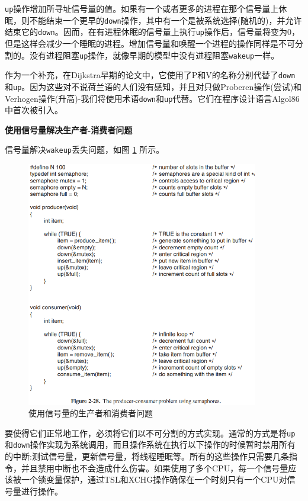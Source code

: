 	\texttt{up}操作增加所寻址信号量的值。如果有一个或者更多的进程在那个信号量上休眠，则不能结束一个更早的\texttt{down}操作，其中有一个是被系统选择(随机的)，并允许结束它的\texttt{down}。因而，在有进程休眠的信号量上执行\texttt{up}操作后，信号量将变为0，但是这样会减少一个睡眠的进程。增加信号量和唤醒一个进程的操作同样是不可分割的。没有进程阻塞\texttt{up}操作，就像早期的模型中没有进程阻塞\texttt{wakeup}一样。
	
	作为一个补充，在Dijkstra早期的论文中，它使用了P和V的名称分别代替了\texttt{down}和\texttt{up}。因为这些对不说荷兰语的人们没有感知，并且对只做Proberen操作(尝试)和Verhogen操作(升高)-我们将使用术语\texttt{down}和\texttt{up}代替。它们在程序设计语言Algol86中首次被引入。
	
	\textbf{使用信号量解决生产者-消费者问题}
	
	信号量解决\texttt{wakeup}丢失问题，如图 \ref{fig:semaphores} 所示。
	
	\begin{figure}[ht]\small
		\centering
		\includegraphics[width=0.90\textwidth]{FIG/2-28.png}
		\caption{使用信号量的生产者和消费者问题}\label{fig:semaphores}
	\end{figure}
	
	要使得它们正常地工作，必须将它们以不可分割的方式实现。通常的方式是将\texttt{up}和\texttt{down}操作实现为系统调用，而且操作系统在执行以下操作的时候暂时禁用所有的中断:测试信号量，更新信号量，将线程睡眠等。所有的这些操作只需要几条指令，并且禁用中断也不会造成什么伤害。如果使用了多个CPU，每一个信号量应该被一个锁变量保护，通过TSL和XCHG操作确保在一个时刻只有一个CPU对信号量进行操作。
	
